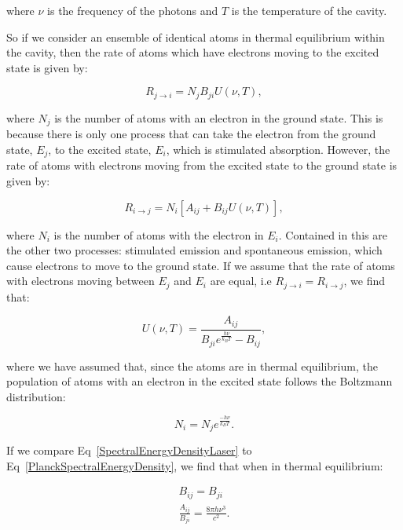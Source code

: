 \noindent where $\nu$ is the frequency of the photons and $T$ is the temperature of the cavity.

\noindent So if we consider an ensemble of identical atoms in thermal equilibrium within the cavity, then the rate of atoms which have electrons moving to the excited state is given by:

\begin{equation}
    R_{j \rightarrow i} = N_j B_{ji} U(\nu, T),
    \label{StimulatedAbsorptionAtoms}
\end{equation}

\noindent where $N_j$ is the number of atoms with an electron in the ground state. This is because there is only one process that can take the electron from the ground state, $E_j$, to the excited state, $E_i$, which is stimulated absorption. However, the rate of atoms with electrons moving from the excited state to the ground state is given by:

\begin{equation}
    R_{i \rightarrow j} = N_i[A_{ij} + B_{ij} U(\nu, T)],
    \label{StimulatedSpontaneousEmissionAtoms}
\end{equation}

\noindent where $N_i$ is the number of atoms with the electron in $E_i$. Contained in this are the other two processes: stimulated emission and spontaneous emission, which cause electrons to move to the ground state. If we assume that the rate of atoms with electrons moving between $E_j$ and $E_i$ are equal, i.e $R_{j \rightarrow i} = R_{i \rightarrow j}$, we find that:

\begin{equation}
    U(\nu, T) = \frac{A_{ij}}{B_{ji} e^{\frac{h \nu}{k_B T}} - B_{ij}},
    \label{SpectralEnergyDensityLaser}
\end{equation}

\noindent where we have assumed that, since the atoms are in thermal equilibrium, the population of atoms with an electron in the excited state follows the Boltzmann distribution:

\begin{equation}
    N_i = N_j e^{\frac{-h \nu}{k_B T}}.
    \label{BoltzmannDistributionPopulationStates}
\end{equation}

\noindent If we compare Eq~\ref{SpectralEnergyDensityLaser} to Eq~\ref{PlanckSpectralEnergyDensity}, we find that when in thermal equilibrium:

\begin{eqnarray}
    B_{ij} = B_{ji} \label{InitialEinsteinCondition}\\
    \frac{A_{ij}}{B_{ji}} = \frac{8 \pi h \nu^3}{c^2}.\label{FinalEinsteinCondition}
\end{eqnarray}

